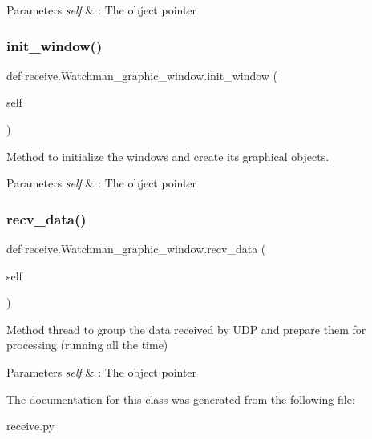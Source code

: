 \begin{DoxyParams}{Parameters}
{\em self} & \+: The object pointer \\
\hline
\end{DoxyParams}
\mbox{\label{classreceive_1_1_watchman__graphic__window_a784cc76bfc1b70575c6fda548c3ca8b7}} 
\subsubsection{init\_window()}
{\footnotesize\ttfamily def receive.\+Watchman\+\_\+graphic\+\_\+window.\+init\+\_\+window (\begin{DoxyParamCaption}\item[{}]{self }\end{DoxyParamCaption})}



Method to initialize the windows and create its graphical objects. 


\begin{DoxyParams}{Parameters}
{\em self} & \+: The object pointer \\
\hline
\end{DoxyParams}
\mbox{\label{classreceive_1_1_watchman__graphic__window_ab2f6066c7bc853a9acaecdcb19b91b55}} 
\subsubsection{recv\_data()}
{\footnotesize\ttfamily def receive.\+Watchman\+\_\+graphic\+\_\+window.\+recv\+\_\+data (\begin{DoxyParamCaption}\item[{}]{self }\end{DoxyParamCaption})}



Method thread to group the data received by U\+DP and prepare them for processing (running all the time) 


\begin{DoxyParams}{Parameters}
{\em self} & \+: The object pointer \\
\hline
\end{DoxyParams}


The documentation for this class was generated from the following file\+:\begin{DoxyCompactItemize}
\item 
receive.\+py\end{DoxyCompactItemize}
